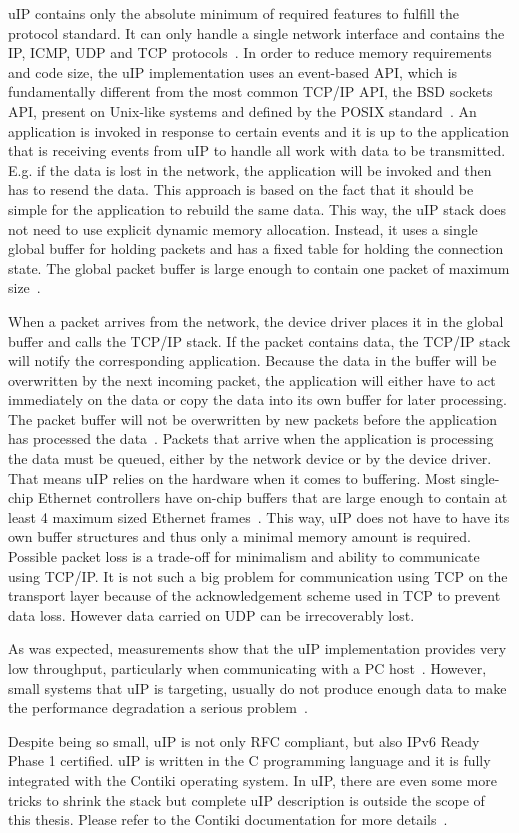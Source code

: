 uIP contains only the absolute minimum of required features to fulfill the protocol standard.
It can only handle a single network interface and contains the IP, ICMP, UDP and TCP protocols~\cite{contiki-docs}.
In order to reduce memory requirements and code size,
the uIP implementation uses an event-based API, which is fundamentally different
from the most common TCP/IP API, the BSD sockets API, present on Unix-like systems
and defined by the POSIX standard~\cite{thesis-programming,posix}.
An application is invoked in response to certain events and
it is up to the application that is receiving events from uIP to handle all
work with data to be transmitted. E.g. if the data is lost in the network,
the application will be invoked and then has to resend the data.
This approach is based on the fact that it should be simple for the application
to rebuild the same data.
This way, the uIP stack does not need to use explicit dynamic memory allocation.
Instead, it uses a single global buffer for holding packets and has a fixed
table for holding the connection state.
The global packet buffer is large enough to contain one packet of maximum size~\cite{contiki-docs}.

When a packet arrives from the network, the device driver places it in the
global buffer and calls the TCP/IP stack.
If the packet contains data, the TCP/IP stack will notify the corresponding application.
Because the data in the buffer will be overwritten by the next incoming packet,
the application will either have to act immediately on the data or copy the data into
its own buffer for later processing.
The packet buffer will not be overwritten by new packets before the application has processed the data~\cite{contiki-docs}.
Packets that arrive when the application is processing the data must be queued,
either by the network device or by the device driver.
That means uIP relies on the hardware when it comes to buffering.
Most single-chip Ethernet controllers have on-chip buffers
that are large enough to contain at least 4 maximum sized Ethernet frames~\cite{contiki-docs}.
This way, uIP does not have to have its own buffer structures and thus
only a minimal memory amount is required.
Possible packet loss is a trade-off for minimalism and ability to communicate using TCP/IP.
It is not such a big problem for communication using TCP on the transport layer
because of the acknowledgement scheme used in TCP to prevent data loss.
However data carried on UDP can be irrecoverably lost.

As was expected, measurements show that the uIP implementation provides very low
throughput, particularly when communicating with a PC host~\cite{thesis-towards}.
However, small systems that uIP is targeting, usually do not produce enough data
to make the performance degradation a serious problem~\cite{thesis-towards}.

Despite being so small, uIP is not only RFC compliant, but also IPv6 Ready Phase 1 certified.
uIP is written in the C programming language and it is fully integrated with the Contiki operating system.
In uIP, there are even some more tricks to shrink the stack
but complete uIP description is outside the scope of this thesis.
Please refer to the Contiki documentation for more details~\cite{contiki-docs}.
